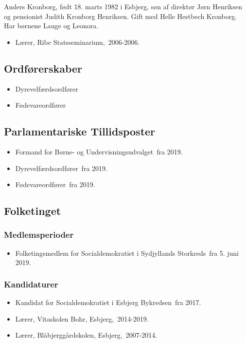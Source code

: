 \documentclass[11pt, a4paper]{awesome-cv}
\begin{document}
\makecvheader[R]
\makelettertitle
\begin{cvletter}
Anders Kronborg, født 18. marts 1982 i Esbjerg, søn af direktør Jørn Henriksen og pensionist Judith Kronborg Henriksen. Gift med Helle Hestbech Kronborg. Har børnene Lauge og Leonora.

\begin{itemize}
\item Lærer, Ribe Statsseminarium, 2006-2006.
\end{itemize}
\subsection*{Ordførerskaber}
\begin{itemize}
\item Dyrevelfærdsordfører
\item Fødevareordfører
\end{itemize}
\subsection*{Parlamentariske Tillidsposter}
\begin{itemize}
\item Formand for Børne- og Undervisningsudvalget fra 2019.
\item Dyrevelfærdsordfører fra 2019.
\item Fødevareordfører fra 2019.
\end{itemize}
\subsection*{Folketinget}
\subsubsection*{Medlemsperioder}
\begin{itemize}
\item Folketingsmedlem for Socialdemokratiet i Sydjyllands Storkreds fra 5. juni 2019.
\end{itemize}
\subsubsection*{Kandidaturer}
\begin{itemize}
\item Kandidat for Socialdemokratiet i Esbjerg Bykredsen fra 2017.
\end{itemize}
\begin{itemize}
\item Lærer, Vitaskolen Bohr, Esbjerg, 2014-2019.
\item Lærer, Blåbjerggårdskolen, Esbjerg, 2007-2014.
\end{itemize}
\end{cvletter}
\end{document}
